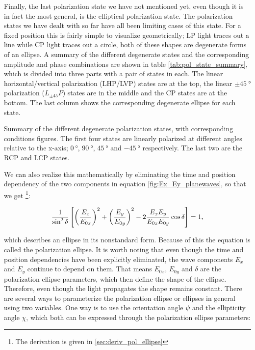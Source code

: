 Finally, the last polarization state we have not mentioned yet, even though it is in fact the most general, is the elliptical polarization state. The polarization states we have dealt with so far have all been limiting cases of this state. For a fixed position this is fairly simple to visualize geometrically; LP light traces out a line while CP light traces out a circle, both of these shapes are degenerate forms of an ellipse. A summary of the different degenerate states and the corresponding amplitude and phase combinations are shown in table \ref{tab:pol_state_summary}, which is divided into three parts with a pair of states in each. The linear horizontal/vertical polarization (LHP/LVP) states are at the top, the linear $\pm\SI{45}{\degree}$ polarization ($L_{\pm45}P$) states are in the middle and the CP states are at the bottom. The last column shows the corresponding degenerate ellipse for each state.

\begin{table}[h]
    \centering
    
    \caption{Summary of the different degenerate polarization states, with corresponding conditions figures. The first four states are linearly polarized at different angles relative to the x-axis; $\SI{0}{\degree}$, $\SI{90}{\degree}$, $\SI{45}{\degree}$ and $\SI{-45}{\degree}$ respectively. The last two are the RCP and LCP states.}
    \label{tab:pol_state_summary}
\end{table}

We can also realize this mathematically by eliminating the time and position dependency of the two components in equation \ref{fig:Ex_Ey_planewaves}, so that we get \footnote{The derivation is given in \ref{sec:deriv_pol_ellipse}}:

\begin{equation}
    \centering
    \frac{1}{\sin^2 \delta} \left[ \left(\frac{E_x}{E_{0x}}\right)^2+\left(\frac{E_y}{E_{0y}}\right)^2-2\frac{E_x E_y}{E_{0x} E_{0y}}\cos \delta \right]=1,
\end{equation}

which describes an ellipse in its nonstandard form. Because of this the equation is called the polarization ellipse. It is worth noting that even though the time and position dependencies have been explicitly eliminated, the wave components $E_x$ and $E_y$ continue to depend on them. That means $E_{0x}$, $E_{0y}$ and $\delta$ are the polarization ellipse parameters, which then define the shape of the ellipse. Therefore, even though the light propagates the shape remains constant. There are several ways to parameterize the polarization ellipse or ellipses in general using two variables. One way is to use the orientation angle $\psi$ and the ellipticity angle $\chi$, which both can be expressed through the polarization ellipse parameters: 

